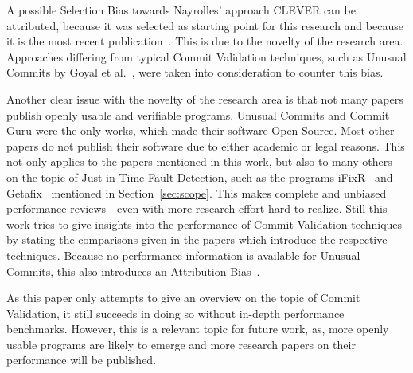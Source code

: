 A possible Selection Bias towards Nayrolles' approach CLEVER can be attributed, because it was selected as starting point for this research and because it is the most recent publication~\cite{Nayrolles2018}. This is due to the novelty of the research area. Approaches differing from typical Commit Validation techniques, such as Unusual Commits by Goyal et al.~\cite{Goyal2017}, were taken into consideration to counter this bias.

Another clear issue with the novelty of the research area is that not many papers publish openly usable and verifiable programs. Unusual Commits and Commit Guru were the only works, which made their software Open Source. Most other papers do not publish their software due to either academic or legal reasons. This not only applies to the papers mentioned in this work, but also to many others on the topic of Just-in-Time Fault Detection, such as the programs iFixR~\cite{Koyuncu2019} and Getafix~\cite{Bader2019} mentioned in Section~\ref{sec:scope}. This makes complete and unbiased performance reviews - even with more research effort hard to realize. Still this work tries to give insights into the performance of Commit Validation techniques by stating the comparisons given in the papers which introduce the respective techniques. Because no performance information is available for Unusual Commits, this also introduces an Attribution Bias~\cite{Goyal2017}.

As this paper only attempts to give an overview on the topic of Commit Validation, it still succeeds in doing so without in-depth performance benchmarks. However, this is a relevant topic for future work, as, more openly usable programs are likely to emerge and more research papers on their performance will be published.





